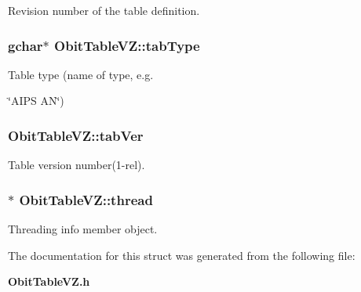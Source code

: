 Revision number of the table definition. 

\subsubsection{\setlength{\rightskip}{0pt plus 5cm}gchar$\ast$ {\bf Obit\-Table\-VZ::tab\-Type}}\label{structObitTableVZ_o12}


Table type (name of type, e.g. 

\char`\"{}AIPS AN\char`\"{}) 
\subsubsection{ {\bf Obit\-Table\-VZ::tab\-Ver}}\label{structObitTableVZ_o13}


Table version number(1-rel). 

\subsubsection{$\ast$ {\bf Obit\-Table\-VZ::thread}}\label{structObitTableVZ_o4}


Threading info member object. 



The documentation for this struct was generated from the following file:\begin{CompactItemize}
\item 
{\bf Obit\-Table\-VZ.h}\end{CompactItemize}
